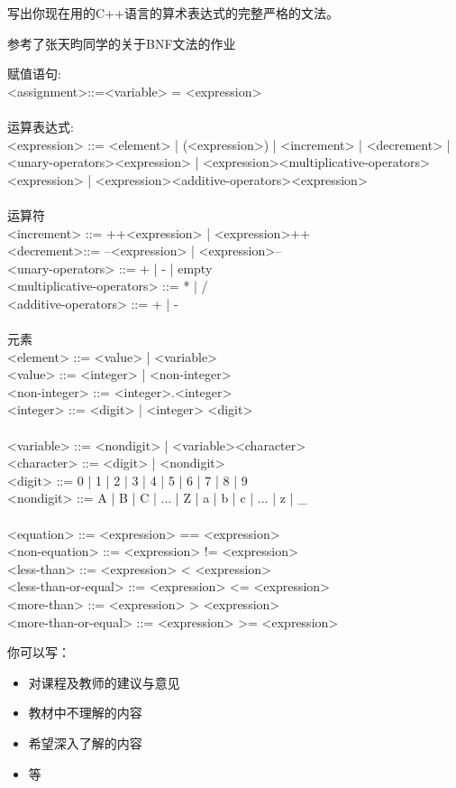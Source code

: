 \documentclass[11pt, a4paper, UTF8]{ctexart}
\begin{document}
\begin{problem}[第六讲]
写出你现在用的C++语言的算术表达式的完整严格的文法。
\end{problem}
\begin{remark}
参考了张天昀同学的关于BNF文法的作业
\end{remark}
\begin{solution}
赋值语句:\\
<assignment>::=<variable> = <expression>\\
\\
运算表达式:\\
<expression> ::= <element> | (<expression>) | <increment> | <decrement> | <unary-operators><expression> | <expression><multiplicative-operators><expression> | <expression><additive-operators><expression>\\
\\
运算符\\
<increment> ::= ++<expression> | <expression>++\\
<decrement>::= --<expression> | <expression>--\\
<unary-operators> ::= + | - | empty \\
<multiplicative-operators> ::= * | / \\
<additive-operators> ::= + | - \\
\\
元素\\
<element> ::= <value> | <variable>\\
<value> ::= <integer> | <non-integer>\\
<non-integer> ::= <integer>.<integer>\\
<integer> ::= <digit> | <integer> <digit>\\
\\
<variable> ::= <nondigit> | <variable><character>\\
<character> ::= <digit> | <nondigit>\\
<digit> ::= 0 | 1 | 2 | 3 | 4 | 5 | 6 | 7 | 8 | 9 \\
<nondigit> ::= A | B | C | ... | Z | a | b | c | ... | z | \_  \\
\\
<equation> ::= <expression> == <expression> \\
<non-equation> ::= <expression> != <expression>\\
<less-than> ::= <expression>  < <expression>\\
<less-than-or-equal> ::= <expression> <= <expression>\\
<more-than> ::= <expression> > <expression>\\
<more-than-or-equal> ::= <expression> >= <expression>
 
\end{solution}



\beginfb	%

你可以写：
\begin{itemize}
  \item 对课程及教师的建议与意见
  \item 教材中不理解的内容
  \item 希望深入了解的内容
  \item 等
\end{itemize}
\end{document}
